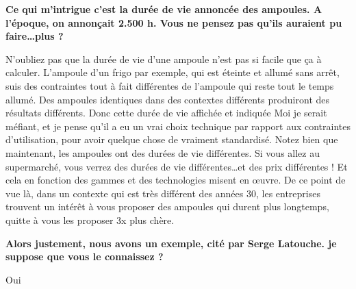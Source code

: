 \begin{small}


\textbf{Ce qui m'intrigue c'est la  durée de vie annoncée des ampoules. A l'époque, on annonçait 2.500 h. Vous ne pensez pas qu'ils auraient pu faire\dots plus ?
}\smallbreak

N'oubliez pas que la durée de vie d'une ampoule n'est pas si facile que ça à calculer. L'ampoule d'un frigo par exemple, qui est éteinte et allumé sans arrêt, suis des contraintes tout à fait différentes de l'ampoule qui reste tout le temps allumé.
Des ampoules identiques dans des contextes différents produiront des résultats différents. Donc cette durée de vie affichée et indiquée %
Moi je serait méfiant, et je pense qu'il a eu un vrai choix technique par rapport aux contraintes d'utilisation, pour avoir quelque chose de vraiment standardisé.
Notez bien que maintenant, les ampoules ont des durées de vie différentes. Si vous allez au supermarché, vous verrez des durées de vie différentes\dots et des prix différentes ! Et cela en fonction des gammes et des technologies misent en œuvre.
De ce point de vue là, dans un contexte qui est très différent des années 30, les entreprises trouvent un intérêt à vous proposer des ampoules qui durent plus longtemps, quitte à vous les proposer 3x plus chère.

\textbf{Alors justement, nous avons un exemple, cité par Serge Latouche. je suppose que vous le connaissez ?}
\smallbreak


Oui


\end{small}
